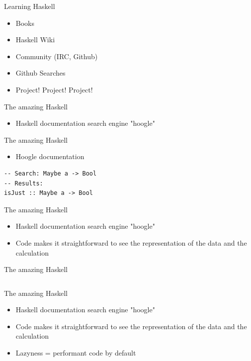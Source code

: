 \documentclass[10pt]{beamer}
\begin{document}
\begin{frame}{Learning Haskell}
\begin{itemize}
\item Books
\item Haskell Wiki
\item Community (IRC, Github)
\item Github Searches
\item Project! Project! Project!
\end{itemize}
\end{frame}

\begin{frame}{The amazing Haskell}
\begin{itemize}
\item Haskell documentation search engine "hoogle"
\end{itemize}
\end{frame}

\begin{frame}[fragile]{The amazing Haskell} 
\begin{itemize}
\item Hoogle documentation
\end{itemize}
\begin{verbatim}
-- Search: Maybe a -> Bool
-- Results:
isJust :: Maybe a -> Bool
\end{verbatim}
\end{frame} 

\begin{frame}{The amazing Haskell}
\begin{itemize}
\item Haskell documentation search engine "hoogle"
\item Code makes it straightforward to see the representation of the data and the calculation
\end{itemize}
\end{frame}

\begin{frame}[fragile]{The amazing Haskell} 
\begin{verbatim}
\end{verbatim}
\end{frame} 

\begin{frame}{The amazing Haskell}
\begin{itemize}
\item Haskell documentation search engine "hoogle"
\item Code makes it straightforward to see the representation of the data and the calculation
\item Lazyness = performant code by default
\end{itemize}
\end{frame}
\end{document}

